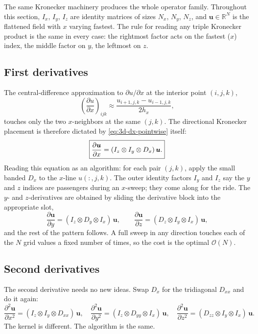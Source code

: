 \documentclass[11pt]{article}
\newcommand{\kron}{\otimes}
\newcommand{\Dx}{D_{x}}
\newcommand{\Dy}{D_{y}}
\newcommand{\Dz}{D_{z}}
\newcommand{\Dxx}{D_{xx}}
\newcommand{\Dyy}{D_{yy}}
\newcommand{\Dzz}{D_{zz}}
\newcommand{\Ix}{I_{x}}
\newcommand{\Iy}{I_{y}}
\newcommand{\Iz}{I_{z}}
\newcommand{\R}{\mathbb{R}}
\newcommand{\bigO}{\mathcal{O}}
\newcommand{\Nall}{N}
\begin{document}
The same Kronecker machinery produces the whole operator family.
Throughout this section, $\Ix$, $\Iy$, $\Iz$ are identity matrices
of sizes $N_x$, $N_y$, $N_z$, and $\bm{u} \in \R^{\Nall}$ is the
flattened field with $x$ varying fastest.  The rule for reading any
triple Kronecker product is the same in every case: the rightmost
factor acts on the fastest ($x$) index, the middle factor on $y$,
the leftmost on $z$.

\subsection{First derivatives}
\label{sec:3d-first}

The central-difference approximation to $\partial u/\partial x$ at
the interior point $(i,j,k)$,
\begin{equation}
\label{eq:3d-dx-pointwise}
  \left(\frac{\partial u}{\partial x}\right)_{ijk}
  \approx
  \frac{u_{i+1,j,k} - u_{i-1,j,k}}{2h_x},
\end{equation}
touches only the two $x$-neighbors at the same $(j,k)$.  The
directional Kronecker placement is therefore dictated by
\cref{eq:3d-dx-pointwise} itself:
\begin{equation}
\label{eq:3d-Dx}
  \boxed{%
    \frac{\partial \bm{u}}{\partial x}
    = (\Iz \kron \Iy \kron \Dx)\,\bm{u}.
  }
\end{equation}
Reading this equation as an algorithm: for each pair $(j,k)$, apply
the small banded $\Dx$ to the $x$-line $u(:,j,k)$.  The outer identity
factors $\Iy$ and $\Iz$ say the $y$ and $z$ indices are passengers
during an $x$-sweep; they come along for the ride.  The $y$- and
$z$-derivatives are obtained by sliding the derivative block into
the appropriate slot,
\begin{equation}
\label{eq:3d-Dy-Dz}
  \frac{\partial \bm{u}}{\partial y}
  = (\Iz \kron \Dy \kron \Ix)\,\bm{u},
  \qquad
  \frac{\partial \bm{u}}{\partial z}
  = (\Dz \kron \Iy \kron \Ix)\,\bm{u},
\end{equation}
and the rest of the pattern follows.  A full sweep in any direction
touches each of the $\Nall$ grid values a fixed number of times, so
the cost is the optimal $\bigO(\Nall)$.

\subsection{Second derivatives}
\label{sec:3d-second}

The second derivative needs no new ideas.  Swap $\Dx$ for the
tridiagonal $\Dxx$ and do it again:
\begin{equation}
\label{eq:3d-Dxx}
  \frac{\partial^2 \bm{u}}{\partial x^2}
  = (\Iz \kron \Iy \kron \Dxx)\,\bm{u},
  \quad
  \frac{\partial^2 \bm{u}}{\partial y^2}
  = (\Iz \kron \Dyy \kron \Ix)\,\bm{u},
  \quad
  \frac{\partial^2 \bm{u}}{\partial z^2}
  = (\Dzz \kron \Iy \kron \Ix)\,\bm{u}.
\end{equation}
The kernel is different.  The algorithm is the same.
\end{document}

